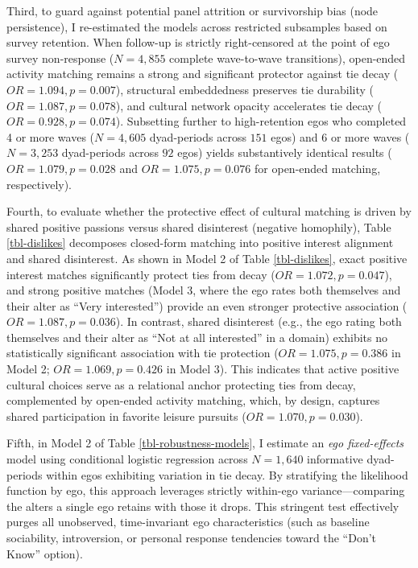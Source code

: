 \documentclass[12pt,letterpaper]{article}
\begin{document}


Third, to guard against potential panel attrition or survivorship bias (node persistence), I re-estimated the models across restricted subsamples based on survey retention. When follow-up is strictly right-censored at the point of ego survey non-response ($N = 4,855$ complete wave-to-wave transitions), open-ended activity matching remains a strong and significant protector against tie decay ($OR = 1.094, p = 0.007$), structural embeddedness preserves tie durability ($OR = 1.087, p = 0.078$), and cultural network opacity accelerates tie decay ($OR = 0.928, p = 0.074$). Subsetting further to high-retention egos who completed 4 or more waves ($N = 4,605$ dyad-periods across $151$ egos) and 6 or more waves ($N = 3,253$ dyad-periods across $92$ egos) yields substantively identical results ($OR = 1.079, p = 0.028$ and $OR = 1.075, p = 0.076$ for open-ended matching, respectively).

Fourth, to evaluate whether the protective effect of cultural matching is driven by shared positive passions versus shared disinterest (negative homophily), Table \ref{tbl-dislikes} decomposes closed-form matching into positive interest alignment and shared disinterest. As shown in Model 2 of Table \ref{tbl-dislikes}, exact positive interest matches significantly protect ties from decay ($OR = 1.072, p = 0.047$), and strong positive matches (Model 3, where the ego rates both themselves and their alter as ``Very interested'') provide an even stronger protective association ($OR = 1.087, p = 0.036$). In contrast, shared disinterest (e.g., the ego rating both themselves and their alter as ``Not at all interested'' in a domain) exhibits no statistically significant association with tie protection ($OR = 1.075, p = 0.386$ in Model 2; $OR = 1.069, p = 0.426$ in Model 3). This indicates that active positive cultural choices serve as a relational anchor protecting ties from decay, complemented by open-ended activity matching, which, by design, captures shared participation in favorite leisure pursuits ($OR = 1.070, p = 0.030$).



Fifth, in Model 2 of Table \ref{tbl-robustness-models}, I estimate an \textit{ego fixed-effects} model using conditional logistic regression \citep{graubard2011conditional-502} across $N = 1,640$ informative dyad-periods within egos exhibiting variation in tie decay. By stratifying the likelihood function by ego, this approach leverages strictly within-ego variance---comparing the alters a single ego retains with those it drops. This stringent test effectively purges all unobserved, time-invariant ego characteristics (such as baseline sociability, introversion, or personal response tendencies toward the ``Don't Know'' option).
\end{document}
